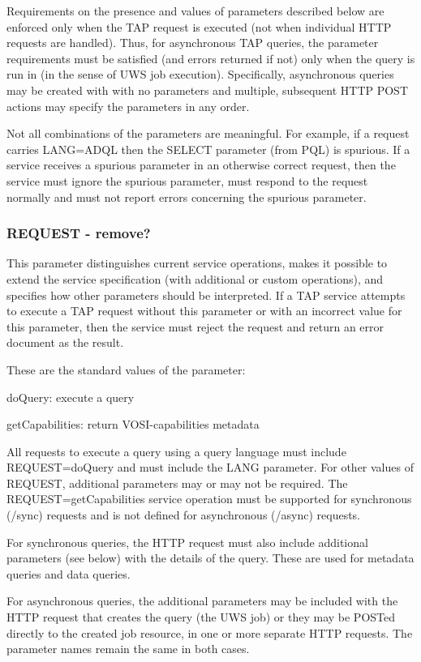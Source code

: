\documentclass[11pt,a4paper]{ivoa}
\begin{document}
Requirements on the presence and values of parameters described below are 
enforced only when the TAP request is executed (not when individual HTTP 
requests are handled). Thus, for asynchronous TAP queries, the parameter 
requirements must be satisfied (and errors returned if not) only when the query 
is run in (in the sense of UWS job execution). Specifically, asynchronous 
queries may be created with with no parameters and multiple, subsequent HTTP 
POST actions may specify the parameters in any order.

Not all combinations of the parameters are meaningful. For example, if a request 
carries  LANG=ADQL then the SELECT parameter (from PQL) is spurious. If a 
service receives a spurious parameter in an otherwise correct request, then the 
service must ignore the spurious parameter, must respond to the request normally 
and must not report errors concerning the spurious parameter.

\subsubsection{REQUEST - remove? }
This parameter distinguishes current service operations, makes it possible to 
extend the service specification (with additional or custom operations), and 
specifies how other parameters should be interpreted. If a TAP service attempts 
to execute a TAP request without this parameter or with an incorrect value for 
this parameter, then the service must reject the request and return an error 
document as the result.

These are the standard values of the parameter:

doQuery: execute a query 

getCapabilities: return VOSI-capabilities metadata 

All requests to execute a query using a query language must 
include REQUEST=doQuery and must include the LANG parameter. For other values of 
REQUEST, additional parameters may or may not be required. The 
REQUEST=getCapabilities service operation must be supported for synchronous 
(/sync) requests and is not defined for asynchronous (/async) requests.

For synchronous queries, the HTTP request must also include additional 
parameters (see below) with the details of the query. These are used for 
metadata queries and data queries.

For asynchronous queries, the additional parameters may be included with the 
HTTP request that creates the query (the UWS job) or they may be POSTed directly 
to the created job resource, in one or more separate HTTP requests. The 
parameter names remain the same in both cases.
\end{document}
